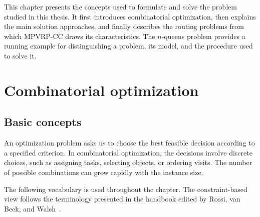 This chapter presents the concepts used to formulate and solve the problem
studied in this thesis. It first introduces combinatorial optimization, then
explains the main solution approaches, and finally describes the routing
problems from which MPVRP-CC draws its characteristics. The $n$-queens problem
provides a running example for distinguishing a problem, its model, and the
procedure used to solve it.

\section{Combinatorial optimization}

\subsection{Basic concepts}

An optimization problem asks us to choose the best feasible decision according
to a specified criterion. In combinatorial optimization, the decisions involve
discrete choices, such as assigning tasks, selecting objects, or ordering visits.
The number of possible combinations can grow rapidly with the instance size.

The following vocabulary is used throughout the chapter. The constraint-based
view follows the terminology presented in the handbook edited by
Rossi, van Beek, and Walsh~\cite{rossi2006handbook}.

